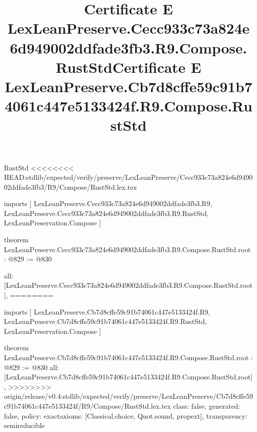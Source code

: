 \begin{lexlean}{RustStd}
<<<<<<<< HEAD:stdlib/expected/verify/preserve/LexLeanPreserve/Cecc933c73a824e6d949002ddfade3fb3/R9/Compose/RustStd.lex.tex
\title{Certificate E LexLeanPreserve.Cecc933c73a824e6d949002ddfade3fb3.R9.Compose.RustStd}
\begin{coremodule}
imports [
  LexLeanPreserve.Cecc933c73a824e6d949002ddfade3fb3.R9,
  LexLeanPreserve.Cecc933c73a824e6d949002ddfade3fb3.R9.RustStd,
  LexLeanPreservation.Compose
]

theorem LexLeanPreserve.Cecc933c73a824e6d949002ddfade3fb3.R9.Compose.RustStd.root : @829 := @830 {
  all: [LexLeanPreserve.Cecc933c73a824e6d949002ddfade3fb3.R9.Compose.RustStd.root],
========
\title{Certificate E LexLeanPreserve.Cb7d8cffe59c91b74061c447e5133424f.R9.Compose.RustStd}
\begin{coremodule}
imports [
  LexLeanPreserve.Cb7d8cffe59c91b74061c447e5133424f.R9,
  LexLeanPreserve.Cb7d8cffe59c91b74061c447e5133424f.R9.RustStd,
  LexLeanPreservation.Compose
]

theorem LexLeanPreserve.Cb7d8cffe59c91b74061c447e5133424f.R9.Compose.RustStd.root : @829 := @830 {
  all: [LexLeanPreserve.Cb7d8cffe59c91b74061c447e5133424f.R9.Compose.RustStd.root],
>>>>>>>> origin/release/v0.4:stdlib/expected/verify/preserve/LexLeanPreserve/Cb7d8cffe59c91b74061c447e5133424f/R9/Compose/RustStd.lex.tex
  class: false,
  generated: false,
  policy: exact{axioms: [Classical.choice, Quot.sound, propext]},
  transparency: semireducible
}


\end{coremodule}}
\end{coremodule}
\end{lexlean}
